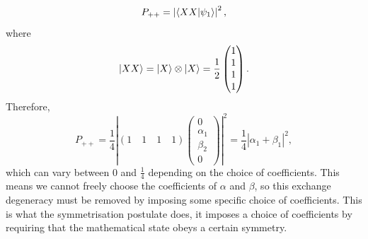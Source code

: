 \documentclass{article}
\begin{document}
\[
    P_{++}=\left| \braket{XX}{\psi _1} \right|^2,
\]
where 
\[
    \ket{XX}=\ket{X}\otimes \ket{X}=\frac{1}{2}\begin{pmatrix}
        1\\1\\1\\1
    \end{pmatrix}.
\]
Therefore, 
\[
    P_{++}=\frac{1}{4}\left| \left( 1\quad 1\quad 1\quad 1 \right)\begin{pmatrix}
        0\\\alpha _1\\\beta _2\\0
    \end{pmatrix} \right|^2=\frac{1}{4}\left| \alpha _1+\beta _1 \right|^2,
\]
which can vary between 0 and $\frac{1}{4}$ depending on the choice of coefficients. This means we cannot freely choose the coefficients of $\alpha $ and $\beta $, so this exchange degeneracy must be removed by imposing some specific choice of coefficients. This is what the symmetrisation postulate does, it imposes a choice of coefficients by requiring that the mathematical state obeys a certain symmetry.
\end{document}
